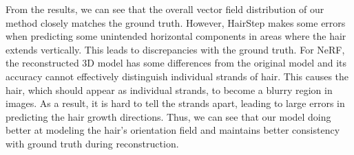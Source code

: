 \documentclass{article}
\begin{document}
From the results, we can see that the overall vector field distribution of our method closely matches the ground truth. However, HairStep makes some errors when predicting some unintended horizontal components in areas where the hair extends vertically. This leads to discrepancies with the ground truth. For NeRF, the reconstructed 3D model has some differences from the original model and its accuracy cannot effectively distinguish individual strands of hair. This causes the hair, which should appear as individual strands, to become a blurry region in images. As a result, it is hard to tell the strands apart, leading to large errors in predicting the hair growth directions. Thus, we can see that our model doing better at modeling the hair's orientation field and maintains better consistency with ground truth during reconstruction.
\end{document}
